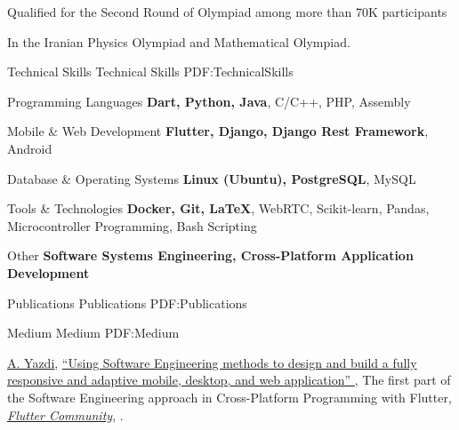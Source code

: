 \documentclass[letterpaper,MMMyyyy,nonstopmode]{resume}
\begin{document}
\begin{Body}
\Gap
\BulletItem
Qualified for the Second Round of Olympiad
among more than 70K participants
\hfill
\textsl{\small{}}
\begin{Detail}
\SubBulletItem
In the Iranian Physics Olympiad and Mathematical Olympiad.
\end{Detail}


\Section
{Technical Skills}
{Technical Skills}
{PDF:TechnicalSkills}

\BulletItem
Programming Languages
\SubBulletItem
\textbf{Dart, Python, Java}, C/C++, PHP, Assembly

\Gap
\BulletItem
Mobile \& Web Development
\SubBulletItem
\textbf{Flutter, Django, Django Rest Framework}, Android


\Gap
\BulletItem
Database \& Operating Systems
\SubBulletItem
\textbf{Linux (Ubuntu), PostgreSQL}, MySQL

\Gap
\BulletItem
Tools \& Technologies
\SubBulletItem
\textbf{Docker, Git, \LaTeX}, WebRTC, Scikit-­learn, Pandas, Microcontroller Programming, Bash Scripting

\Gap
\BulletItem
Other
\SubBulletItem
\textbf{Software Systems Engineering, Cross-Platform Application Development}



\newpage


\Section
{Publications}
{Publications}
{PDF:Publications}

\SubSection
{Medium}
{Medium}
{PDF:Medium}

\begingroup
\renewcommand{\MaxNumberedItem}{[88]}

\NumberedItem{[1]}
\href{https://medium.com/@aliyazdi75}
{\underline{A. Yazdi}},
\href{https://medium.com/flutter-community/the-software-engineering-approach-in-cross-platform-programming-with-flutter-part-1-efcdc8a8fc26?source=friends_link&sk=ceb60f56685ce66c7f9574595748f25b}
{
``Using Software Engineering methods to design and build a fully responsive and adaptive mobile, desktop, and web application''
},
\newline The first part of the Software Engineering approach in Cross-Platform Programming with Flutter,
\href{https://medium.com/flutter-community}
{\textit{Flutter Community}},
.


\end{Body}
\end{document}
